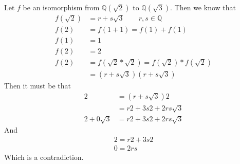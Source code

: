 \documentclass{article}
\begin{document}
\begin{enumerate}
			Let $f$ be an isomorphism from $\mathbb{Q}(\sqrt{2})$ to $\mathbb{Q}(\sqrt{3})$. Then 
			we know that
			\begin{align*}
				f(\sqrt{2}) & = r + s\sqrt{3} \qquad r, s \in \mathbb{Q} \\
				f(2) & = f(1 + 1) = f(1) + f(1) \\
				f(1) & = 1 \\
				f(2) & = 2 \\
				f(2) & = f(\sqrt{2} * \sqrt{2}) = f(\sqrt{2}) * f(\sqrt{2}) \\
			 		 & = (r + s\sqrt{3})(r + s\sqrt{3}) 
			\end{align*}
			Then it must be that
			\begin{align*}
				2 & = (r +s\sqrt{3})2 \\
					& = r2 + 3s2 + 2rs\sqrt{3} \\ 
				2 + 0\sqrt{3} & = r2 + 3s2 + 2rs\sqrt{3} 
			\end{align*}
			And
			\begin{align*}
				2 = r2 + 3s2 \\
				0 = 2rs			
			\end{align*}
			Which is a contradiction.

	\end{enumerate}
\end{document}
